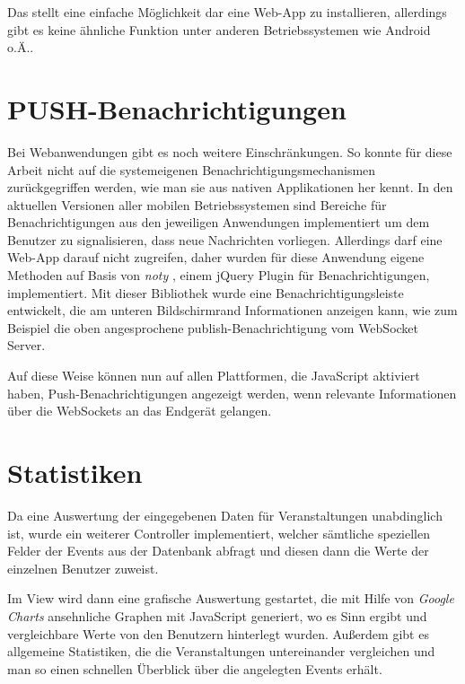 Das stellt eine einfache Möglichkeit dar eine Web-App zu installieren, allerdings gibt es keine ähnliche Funktion unter anderen Betriebssystemen wie Android o.Ä..


\section{PUSH-Benachrichtigungen}
Bei Webanwendungen gibt es noch weitere Einschränkungen. So konnte für diese Arbeit nicht auf die systemeigenen Benachrichtigungsmechanismen zurückgegriffen werden, wie man sie aus nativen Applikationen her kennt. In den aktuellen Versionen aller mobilen Betriebssystemen sind Bereiche für Benachrichtigungen aus den jeweiligen Anwendungen implementiert um dem Benutzer zu signalisieren, dass neue Nachrichten vorliegen. Allerdings darf eine Web-App darauf nicht zugreifen, daher wurden für diese Anwendung eigene Methoden auf Basis von \emph{noty} \cite{noty}, einem jQuery Plugin für Benachrichtigungen, implementiert. Mit dieser Bibliothek wurde eine Benachrichtigungsleiste entwickelt, die am unteren Bildschirmrand Informationen anzeigen kann, wie zum Beispiel die oben angesprochene publish-Benachrichtigung vom WebSocket Server.\par

Auf diese Weise können nun auf allen Plattformen, die JavaScript aktiviert haben, Push-Benachrichtigungen angezeigt werden, wenn relevante Informationen über die WebSockets an das Endgerät gelangen.


\section{Statistiken}
Da eine Auswertung der eingegebenen Daten für Veranstaltungen unabdinglich ist, wurde ein weiterer Controller implementiert, welcher sämtliche speziellen Felder der Events aus der Datenbank abfragt und diesen dann die Werte der einzelnen Benutzer zuweist.\par

Im View wird dann eine grafische Auswertung gestartet, die mit Hilfe von \emph{Google Charts} \cite{google:charts} ansehnliche Graphen mit JavaScript generiert, wo es Sinn ergibt und vergleichbare Werte von den Benutzern hinterlegt wurden. Außerdem gibt es allgemeine Statistiken, die die Veranstaltungen untereinander vergleichen und man so einen schnellen Überblick über die angelegten Events erhält.

